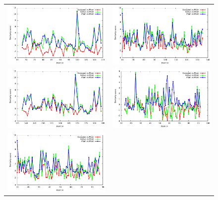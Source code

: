 \documentclass[a4paper,12pt]{article}
\begin{document}
   \begin{figure}[t]
     \centering
     \begin{tabular}{cc}
       \includegraphics[width=8.45cm]{images/1ABO_ph_similarity_bypos.pdf} &
       \includegraphics[width=8.45cm]{images/1BM2_ph_similarity_bypos.pdf} \\
       \includegraphics[width=8.45cm]{images/1CKA_ph_similarity_bypos.pdf} &
       \includegraphics[width=8.45cm]{images/1G9O_ph_similarity_bypos.pdf} \\
       \includegraphics[width=8.45cm]{images/1M61_ph_similarity_bypos.pdf} &

\end{tabular}
\end{figure}
\end{document}
